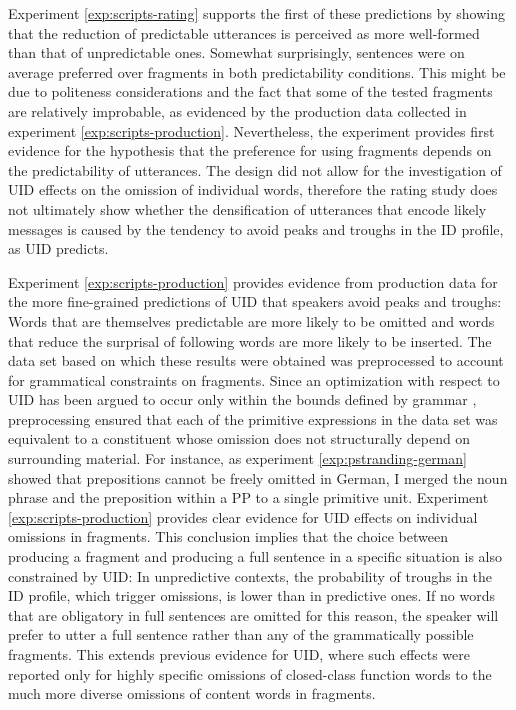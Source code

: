 Experiment \ref{exp:scripts-rating} supports the first of these predictions by showing that the reduction of predictable utterances is perceived as more well-formed than that of unpredictable ones. Somewhat surprisingly, sentences were on average preferred over fragments in both predictability conditions. This might be due to politeness considerations and the fact that some of the tested fragments are relatively improbable, as evidenced by the production data collected in experiment \ref{exp:scripts-production}. Nevertheless, the experiment provides first evidence for the hypothesis that the preference for using fragments depends on the predictability of utterances. The design did not allow for the investigation of UID effects on the omission of individual words, therefore the rating study does not ultimately show whether the densification of utterances that encode likely messages is caused by the tendency to avoid peaks and troughs in the ID profile, as UID predicts.

Experiment \ref{exp:scripts-production} provides evidence from production data for the more fine-grained predictions of UID that speakers avoid peaks and troughs: Words that are themselves predictable are more likely to be omitted and words that reduce the surprisal of following words are more likely to be inserted. The data set based on which these results were obtained was preprocessed to account for grammatical constraints on fragments. Since an optimization with respect to UID has been argued to occur only within the bounds defined by grammar \citep[25]{jaeger2010}, preprocessing ensured that each of the primitive expressions in the data set was equivalent to a constituent whose omission does not structurally depend on surrounding material. For instance, as experiment \ref{exp:pstranding-german} showed that prepositions cannot be freely omitted in German, I merged the noun phrase and the preposition within a PP to a single primitive unit. Experiment \ref{exp:scripts-production} provides clear evidence for UID effects on individual omissions in fragments. This conclusion implies that the choice between producing a fragment and producing a full sentence in a specific situation is also constrained by UID: In unpredictive contexts, the probability of troughs in the ID profile, which trigger omissions, is lower than in predictive ones. If no words that are obligatory in full sentences are omitted for this reason, the speaker will prefer to utter a full sentence rather than any of the grammatically possible fragments. This extends previous evidence for UID, where such effects were reported only for highly specific omissions of closed-class function words to the much more diverse omissions of content words in fragments.

